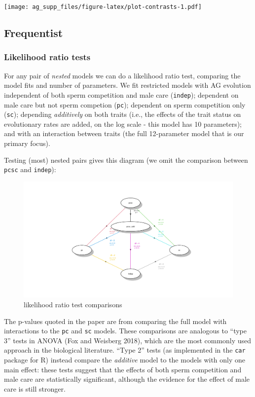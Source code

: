 \documentclass[
]{article}
\begin{document}
\texttt{[image: ag\_supp\_files/figure-latex/plot-contrasts-1.pdf]}

\hypertarget{frequentist}{%
\subsection{Frequentist}\label{frequentist}}

\hypertarget{likelihood-ratio-tests}{%
\subsubsection{Likelihood ratio tests}\label{likelihood-ratio-tests}}

For any pair of \emph{nested} models we can do a likelihood ratio test,
comparing the model fits and number of parameters. We fit restricted
models with AG evolution independent of both sperm competition and male
care (\texttt{indep}); dependent on male care but not sperm competion
(\texttt{pc}); dependent on sperm competition only (\texttt{sc});
depending \emph{additively} on both traits (i.e., the effects of the
trait status on evolutionary rates are added, on the log scale - this
model has 10 parameters); and with an interaction between traits (the
full 12-parameter model that is our primary focus).

Testing (most) nested pairs gives this diagram (we omit the comparison
between \texttt{pcsc} and \texttt{indep}):

\begin{figure}
\centering
\includegraphics{pix/lrt_comp.pdf}
\caption{likelihood ratio test comparisons}
\end{figure}

The p-values quoted in the paper are from comparing the full model with
interactions to the \texttt{pc} and \texttt{sc} models. These
comparisons are analogous to ``type 3'' tests in ANOVA (Fox and Weisberg
2018), which are the most commonly used approach in the biological
literature. ``Type 2'' tests (as implemented in the \texttt{car} package
for R) instead compare the \emph{additive} model to the models with only
one main effect: these tests suggest that the effects of both sperm
competition and male care are statistically significant, although the
evidence for the effect of male care is still stronger.
\end{document}
